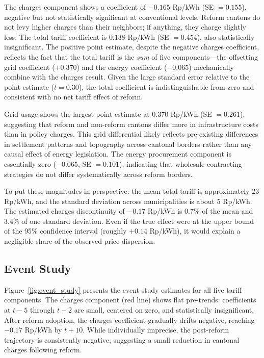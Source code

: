 \documentclass[12pt]{article}
\begin{document}
The charges component shows a coefficient of $-0.165$ Rp/kWh (SE $= 0.155$), negative but not statistically significant at conventional levels. Reform cantons do not levy higher charges than their neighbors; if anything, they charge slightly less. The total tariff coefficient is $0.138$ Rp/kWh (SE $= 0.454$), also statistically insignificant. The positive point estimate, despite the negative charges coefficient, reflects the fact that the total tariff is the \textit{sum} of five components---the offsetting grid coefficient ($+0.370$) and the energy coefficient ($-0.065$) mechanically combine with the charges result. Given the large standard error relative to the point estimate ($t = 0.30$), the total coefficient is indistinguishable from zero and consistent with no net tariff effect of reform.

Grid usage shows the largest point estimate at $0.370$ Rp/kWh (SE $= 0.261$), suggesting that reform and non-reform cantons differ more in infrastructure costs than in policy charges. This grid differential likely reflects pre-existing differences in settlement patterns and topography across cantonal borders rather than any causal effect of energy legislation. The energy procurement component is essentially zero ($-0.065$, SE $= 0.101$), indicating that wholesale contracting strategies do not differ systematically across reform borders.

To put these magnitudes in perspective: the mean total tariff is approximately 23 Rp/kWh, and the standard deviation across municipalities is about 5 Rp/kWh. The estimated charges discontinuity of $-0.17$ Rp/kWh is 0.7\% of the mean and 3.4\% of one standard deviation. Even if the true effect were at the upper bound of the 95\% confidence interval (roughly $+0.14$ Rp/kWh), it would explain a negligible share of the observed price dispersion.



\subsection{Event Study}

Figure~\ref{fig:event_study} presents the event study estimates for all five tariff components. The charges component (red line) shows flat pre-trends: coefficients at $t-5$ through $t-2$ are small, centered on zero, and statistically insignificant. After reform adoption, the charges coefficient gradually drifts negative, reaching $-0.17$ Rp/kWh by $t+10$. While individually imprecise, the post-reform trajectory is consistently negative, suggesting a small reduction in cantonal charges following reform.
\end{document}
